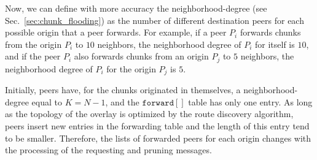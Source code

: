 Now, we can define with more accuracy the \gls{neighborhood-degree}
(see Sec.~\ref{sec:chunk_flooding}) as the number of different
destination peers for each possible origin that a peer forwards. For
example, if a peer $P_i$ forwards chunks from the origin $P_i$ to $10$
neighbors, the neighborhood degree of $P_i$ for itself is $10$, and if
the peer $P_i$ also forwards chunks from an origin $P_j$ to $5$
neighbors, the neighborhood degree of $P_i$ for the origin $P_j$ is
$5$.

Initially, peers have, for the chunks originated in themselves, a
\gls{neighborhood-degree} equal to $K=N-1$, and the
$\mathtt{forward}[]$ table has only one entry. As long as the topology
of the overlay is optimized by the route discovery algorithm, peers
insert new entries in the forwarding table and the length of this
entry tend to be smaller. Therefore, the lists of forwarded peers for
each origin changes with the processing of the requesting and pruning
messages.

